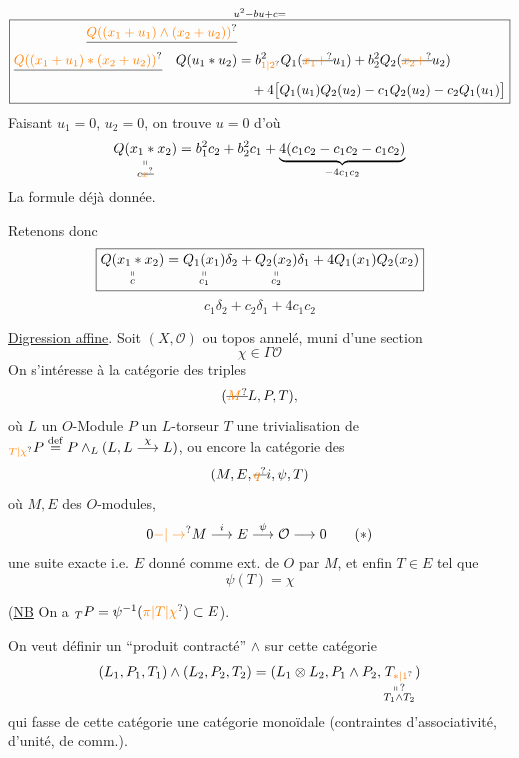 \[
\overset{u^2-bu+c=}{\boxed{\begin{aligned}\deleted{\unsure{Q((x_1+u_1)\wedge(x_2+u_2))}}&\\[-2pt]\deleted{\unsure{Q((x_1+u_1)*(x_2+u_2))}}\quad Q(u_1*u_2)&=b_{\unsure{1|2}}^2Q_1(\deleted{\unsure{x_1+}}u_1)+b_2^2Q_2(\deleted{\unsure{x_2+}}u_2)\\ &\quad+4\big[Q_1(u_1)Q_2(u_2)-c_1Q_2(u_2)-c_2Q_1(u_1)\big]\end{aligned}}}
\]
Faisant $u_1=0$, $u_2=0$, on trouve $u=0$ d'où
\[
\underset{\substack{\shortparallel\\ c\deleted{\unsure{x}}}}{Q(x_1*x_2)}=b_1^2c_2+b_2^2c_1+\underbrace{4(c_1c_2-c_1c_2-c_1c_2)}_{-4c_1c_2}
\]
 La formule déjà donnée.

Retenons donc
\[
\boxed{\underset{\substack{\shortparallel\\c}}{Q(x_1*x_2)}=\underset{\substack{\shortparallel\\c_1}}{Q_1(x_1)}\delta_2+\underset{\substack{\shortparallel\\c_2}}{Q_2(x_2)}\delta_1+4Q_1(x_1)Q_2(x_2)}
\]
\[
c_1\delta_2+c_2\delta_1+4c_1c_2
\]

\uline{Digression affine}.
Soit $(X,\mathcal O)$  ou topos annelé, muni d'une section
\[
\chi\in\Gamma\mathcal O
\]
On s'intéresse à la catégorie des triples
\[
(\deleted{\unsure{M}}L,P,T),
\]
où \quad $L$ un $O$-Module \quad $P$ un $L$-torseur \quad $T$ une trivialisation de ${}_{\unsure{T|\chi}}P\overset{\mathrm{def}}=P\wedge_L(L,L\overset{\chi}{\longrightarrow}L)$,
ou encore la catégorie des  
\[
(M,E,\deleted{\unsure{q}}i,\psi,T)
\]
où $M,E$ des $O$-modules,
\[
0\unsure{\mathbin{-}|\to}M\overset{i}{\longrightarrow}E\overset{\psi}{\longrightarrow}\mathcal O\longrightarrow0\tag*{($*$)}
\]
une suite exacte i.e. $E$   donné comme ext. de $O$ par $M$, et enfin $T\in E$ tel que
\[
\psi(T)=\chi
\]

(\uline{NB} On a ${}_{T}P=\psi^{-1}(\unsure{\pi|T|\chi})\subset E$).

On veut définir un ``produit contracté'' $\wedge$ sur cette catégorie
\[
(L_1,P_1,T_1)\wedge(L_2,P_2,T_2)=(L_1\otimes L_2,P_1\wedge P_2,\underset{\substack{\shortparallel\,?\\T_1\wedge T_2}}{T_{\unsure{*|1}}})
\]
qui fasse de cette catégorie une  catégorie monoïdale (contraintes d'associativité, d'unité, de comm.).
